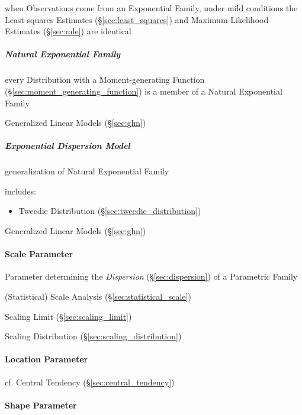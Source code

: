 when Observations come from an Exponential Family, under mild conditions the
Least-squares Estimates (\S\ref{sec:least_squares}) and Maximum-Likelihood
Estimates (\S\ref{sec:mle}) are identical



\subparagraph{Natural Exponential Family}
\label{sec:natural_exponential_family}\hfill

every Distribution with a Moment-generating Function
(\S\ref{sec:moment_generating_function}) is a member of a Natural
Exponential Family

Generalized Linear Models (\S\ref{sec:glm})



\subparagraph{Exponential Dispersion Model}
\label{sec:exponential_dispersion}\hfill

generalization of Natural Exponential Family

includes:
\begin{itemize}
  \item Tweedie Distribution (\S\ref{sec:tweedie_distribution})
\end{itemize}

Generalized Linear Models (\S\ref{sec:glm})



\paragraph{Scale Parameter}\label{sec:scale_parameter}\hfill

Parameter determining the \emph{Dispersion} (\S\ref{sec:dispersion}) of a
Parametric Family

\fist (Statistical) Scale Analysis (\S\ref{sec:statistical_scale})

\fist Scaling Limit (\S\ref{sec:scaling_limit})

\fist Scaling Distribution (\S\ref{sec:scaling_distribution})



\paragraph{Location Parameter}\label{sec:location_parameter}\hfill

cf. Central Tendency (\S\ref{sec:central_tendency})



\paragraph{Shape Parameter}\label{sec:shape_parameter}\hfill

